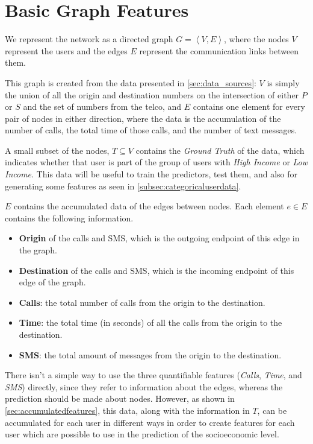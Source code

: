 \section{Basic Graph Features}
\label{sec:graphfeatures}

We represent the network as a directed graph $G = \left< V, E \right>$, where the nodes $V$ represent the users and the edges $E$ represent the communication links between them.

This graph is created from the data presented in \cref{sec:data_sources}: $V$ is simply the union of all the origin and destination numbers on the intersection of either $P$ or $S$ and the set of numbers from the telco, and $E$ contains one element for every pair of nodes in either direction, where the data is the accumulation of the number of calls, the total time of those calls, and the number of text messages.


A small subset of the nodes, $T \subseteq V$ contains the \emph{Ground Truth} of the data, which indicates whether that user is part of the group of users with \emph{High Income} or \emph{Low Income}. This data will be useful to train the predictors, test them, and also for generating some features as seen in \cref{subsec:categoricaluserdata}.

$E$ contains the accumulated data of the edges between nodes. Each element $e \in E$ contains the following information.

\begin{itemize}
	\item \textbf{Origin} of the calls and SMS, which is the outgoing endpoint of this edge in the graph. %
	\item \textbf{Destination} of the calls and SMS, which is the incoming endpoint of this edge of the graph. %
	\item \textbf{Calls}: the total number of calls from the origin to the destination.
	\item \textbf{Time}: the total time (in seconds) of all the calls from the origin to the destination.
	\item \textbf{SMS}: the total amount of messages from the origin to the destination.
\end{itemize}

There isn't a simple way to use the three quantifiable features (\emph{Calls}, \emph{Time}, and \emph{SMS}) directly, since they refer to information about the edges,
whereas the prediction should be made about nodes. However, as shown in \cref{sec:accumulatedfeatures}, this data, along with the information in $T$, can be accumulated for each user in different ways in order to create features for each user which are possible to use in the prediction of the socioeconomic level.

